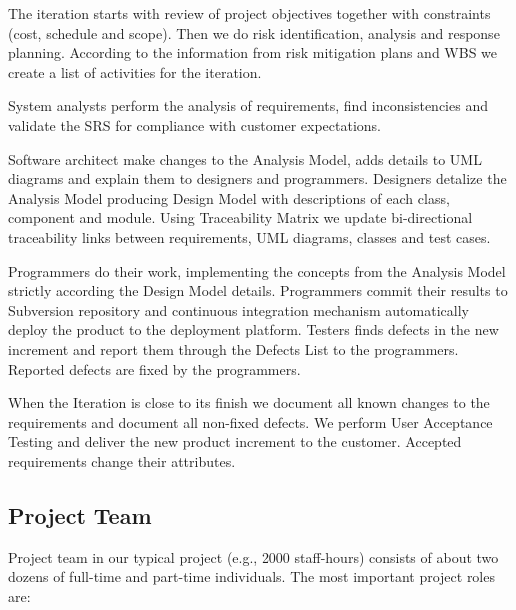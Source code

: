  The iteration starts with review of project objectives together with
constraints (cost, schedule and scope). 
 Then we do risk identification, analysis
and response planning. 
 According to the information from risk mitigation plans and
WBS we create a list of activities for the iteration.

 System analysts perform the analysis of requirements,
find inconsistencies and validate the SRS for compliance with customer
expectations.

 Software architect make changes to the Analysis Model,
adds details to UML diagrams and explain them to designers and programmers.
 Designers detalize the Analysis Model producing
Design Model with descriptions of each class, component and module.
 Using Traceability Matrix we update bi-directional
traceability links between requirements, UML diagrams, classes and test cases.

 Programmers do their work, implementing the concepts
from the Analysis Model strictly according the Design Model details.
 Programmers commit their results to Subversion repository
and continuous integration mechanism automatically deploy the product to the
deployment platform.
 Testers finds defects in the new increment and report
them through the Defects List to the programmers.
 Reported defects are fixed by the programmers.

 When the Iteration is close to its finish we document 
all known changes to the requirements and document all non-fixed defects.
 We perform User Acceptance Testing and deliver the
new product increment to the customer. Accepted requirements change their
attributes.

\subsection*{Project Team}

Project team in our typical project (e.g., 2000 staff-hours) consists of about two
dozens of full-time and part-time individuals. The most important project roles are:

